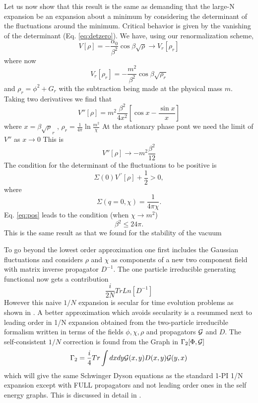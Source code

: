 \documentclass[a4paper,prd,preprint,superscriptaddress,showpacs,byrevtex]{revtex4}
\begin{document}
Let us now show that this result is the same as demanding that the large-N expansion
be an expansion about a minimum by considering the determinant of the
fluctuations around the minimum. Critical behavior is
given by the vanishing of the determinant (Eq. \ref {eq:detzero}). We have, 
using our renormalization scheme,  \begin{equation}
V[\rho] = -\frac {\alpha_0} {\beta^2} \cos \beta \sqrt{\rho} \rightarrow V_r[\rho_r]
\end{equation}
where now
\begin{equation}
V_r[\rho_r] =-\frac {m^2} {\beta^2} \cos \beta \sqrt{\rho_r}
\end{equation}
and
$\rho_r = \phi^2 + G_r$ with the subtraction being made at the physical mass $m$.
Taking two derivatives we find that
\begin{equation}
V''[\rho] = m^2 \frac{\beta^2}{4 x^2} \left[ \cos x - \frac{\sin x}{x}     \right]
\end{equation}
where $x= \beta \sqrt \rho_r$ , $\rho_r = \frac{1}{4 \pi} \ln \frac{m^2}{\chi}$
At the stationary phase pont we need the limit of $V''$ as $x \rightarrow 0$ 
This is
\begin{equation}
V''[\rho] \rightarrow  -m^2 \frac{\beta^2}{12}
\end{equation}
The condition for the determinant of the fluctuations to be positive is 
\begin{equation}
\Sigma(0) V^{\prime \prime} [\rho] + \frac{1}{2}  >0, \label{eq:pos}
\end{equation}
where
\begin{equation}
\Sigma(q=0,\chi) = \frac{1}{4 \pi \chi}.
\end{equation}
Eq. \ref{eq:pos} leads to the condition (when $\chi \rightarrow m^2$) 
\begin{equation}
\beta^2  \leq 24 \pi.
\end{equation}
This is the same result as that we found for the stability of the vacuum 

To go beyond the lowest order approximation one first includes the Gaussian
fluctuations and
considers $\rho$ and  $\chi$ as components of a new two component field with
matrix inverse propagator $D^{-1}$.
The one particle irreducible generating functional now gets a contribution
\begin{equation}
\frac{i}{2 N} Tr Ln[D^{-1}]
\end{equation}
However this naive $1/N$ expansion is secular for time evolution problems as
shown in \cite{ref:Bogdan}.  A better approximation which avoids secularity
is a resummed next to leading order
in 1/N expansion obtained from the two-particle
irreducible formalism \cite{ref:CJT} written in terms of the fields
$\phi,\chi,\rho$ and propagators ${\cal G}$ and $D$. The  self-consistent
$1/N$ correction is found from the Graph in $\Gamma_2[\Phi, {\cal G}]$
\begin{equation} \Gamma_2= \frac{i}{4} Tr \int dx dy  {\cal G}(x,y) D(x,y)
{\cal G}(y,x) \end{equation} which will give the same Schwinger Dyson
equations
as the standard 1-PI 1/N  expansion except with FULL propagators and not
leading order ones in the self energy graphs.  This is discussed in detail
in \cite{ref:dawson} \cite{ref:berges}.
\end{document}
